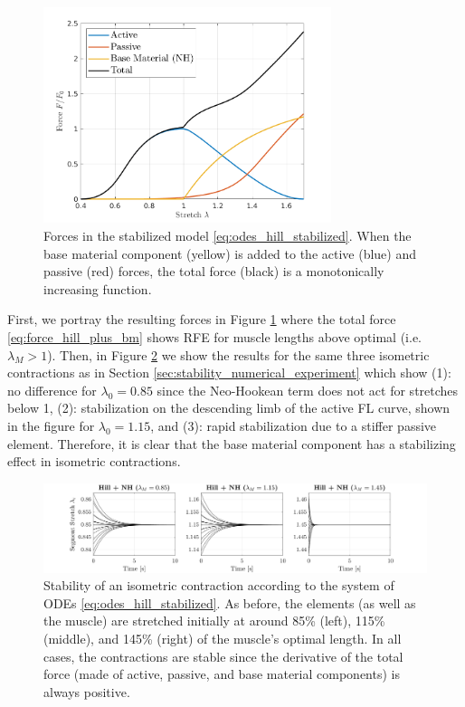 \documentclass{sfuthesis}
\numberwithin{equation}{section}
\numberwithin{figure}{chapter}
\numberwithin{table}{chapter}
\theoremstyle{definition}
\begin{document}
\begin{figure}
    \centering
    \includegraphics[width=0.75\textwidth]{03_forces_with_bm.png}
    \caption{Forces in the stabilized model \eqref{eq:odes_hill_stabilized}. When the base material component (yellow) is added to the active (blue) and passive (red) forces, the total force (black) is a monotonically increasing function.}
    \label{fig:forces_stabilized}
\end{figure}

First, we portray the resulting forces in Figure \ref{fig:forces_stabilized} where the total force \eqref{eq:force_hill_plus_bm} shows RFE for muscle lengths above optimal (i.e. $\lambda_M > 1$). Then, in Figure \ref{fig:hill_plus_nh_stable} we show the results for the same three isometric contractions as in Section \ref{sec:stability_numerical_experiment} which show (1): no difference for $\lambda_0 = 0.85$ since the Neo-Hookean term does not act for stretches below 1, (2): stabilization on the descending limb of the active FL curve, shown in the figure for $\lambda_0 = 1.15$, and (3): rapid stabilization due to a stiffer passive element. Therefore, it is clear that the base material component has a stabilizing effect in isometric contractions. 

\begin{figure}
    \centering
    \hspace*{-1.9em}\includegraphics[width=1.1\textwidth]{06_with_bm_stable.png}
    \caption{Stability of an isometric contraction according to the system of ODEs \eqref{eq:odes_hill_stabilized}. As before, the elements (as well as the muscle) are stretched initially at around 85\% (left), 115\% (middle), and 145\% (right) of the muscle's optimal length. In all cases, the contractions are stable since the derivative of the total force (made of active, passive, and base material components) is always positive.}
    \label{fig:hill_plus_nh_stable}
\end{figure}
\end{document}
